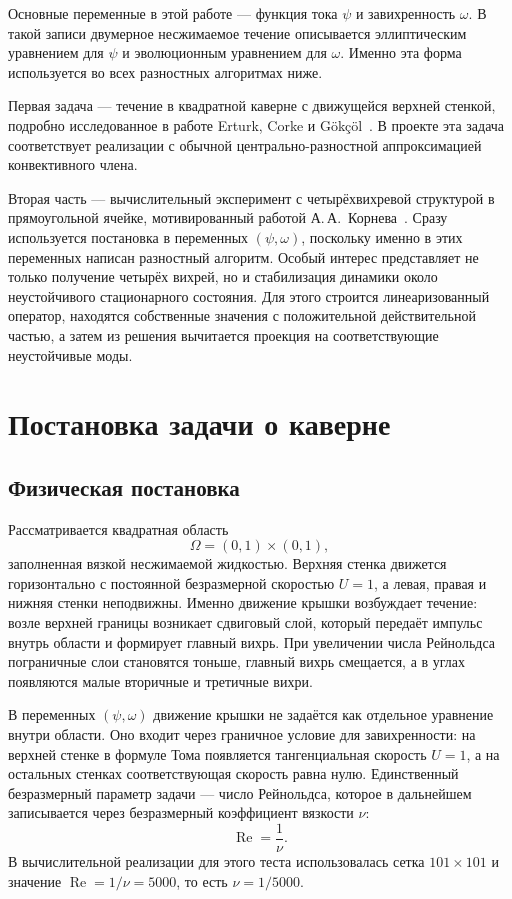 \documentclass[12pt,a4paper]{article}
\newcommand{\Reynolds}{\operatorname{Re}}
\begin{document}
Основные переменные в этой работе --- функция тока \(\psi\) и завихренность \(\omega\).
В такой записи двумерное несжимаемое течение описывается эллиптическим уравнением для \(\psi\) и эволюционным уравнением для \(\omega\).
Именно эта форма используется во всех разностных алгоритмах ниже.

Первая задача --- течение в квадратной каверне с движущейся верхней стенкой, подробно исследованное в работе Erturk, Corke и G\"ok\c{c}\"ol~\cite{erturk2005}.
В проекте эта задача соответствует реализации с обычной центрально-разностной аппроксимацией конвективного члена.

Вторая часть --- вычислительный эксперимент с четырёхвихревой структурой в прямоугольной ячейке, мотивированный работой А.\,А.~Корнева~\cite{kornev2018}.
Сразу используется постановка в переменных \((\psi,\omega)\), поскольку именно в этих переменных написан разностный алгоритм.
Особый интерес представляет не только получение четырёх вихрей, но и стабилизация динамики около неустойчивого стационарного состояния.
Для этого строится линеаризованный оператор, находятся собственные значения с положительной действительной частью, а затем из решения вычитается проекция на соответствующие неустойчивые моды.

\section{Постановка задачи о каверне}

\subsection{Физическая постановка}

Рассматривается квадратная область
\begin{equation}
    \Omega=(0,1)\times(0,1),
    \label{eq:cavity-domain}
\end{equation}
заполненная вязкой несжимаемой жидкостью.
Верхняя стенка движется горизонтально с постоянной безразмерной скоростью \(U=1\), а левая, правая и нижняя стенки неподвижны.
Именно движение крышки возбуждает течение: возле верхней границы возникает сдвиговый слой, который передаёт импульс внутрь области и формирует главный вихрь.
При увеличении числа Рейнольдса пограничные слои становятся тоньше, главный вихрь смещается, а в углах появляются малые вторичные и третичные вихри.

В переменных \((\psi,\omega)\) движение крышки не задаётся как отдельное уравнение внутри области.
Оно входит через граничное условие для завихренности: на верхней стенке в формуле Тома появляется тангенциальная скорость \(U=1\), а на остальных стенках соответствующая скорость равна нулю.
Единственный безразмерный параметр задачи --- число Рейнольдса, которое в дальнейшем записывается через безразмерный коэффициент вязкости \(\nu\):
\begin{equation}
    \Reynolds=\frac{1}{\nu}.
    \label{eq:reynolds}
\end{equation}
В вычислительной реализации для этого теста использовалась сетка \(101\times101\) и значение \(\Reynolds=1/\nu=5000\), то есть \(\nu=1/5000\).
\end{document}
